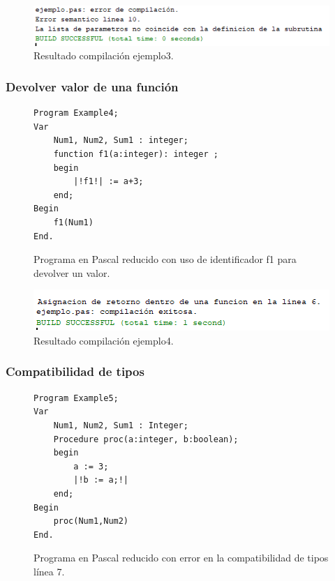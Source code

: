 \begin{figure}[H]
\centering
\includegraphics[]{img/semantico/semantico_ej3.png}
\caption{Resultado compilación ejemplo3.}
\label{fig:semantico_ej3}
\end{figure}

\subsubsection{Devolver valor de una función}
\begin{figure}[H]
\begin{verbatim}
Program Example4;
Var       
    Num1, Num2, Sum1 : integer;
    function f1(a:integer): integer ;
    begin
        |!f1!| := a+3;
    end;
Begin
    f1(Num1)
End.
\end{verbatim}
\caption{Programa en Pascal reducido con uso de identificador f1 para devolver un valor.}
\label{fig:semantico_ej_error_4}
\end{figure}

\begin{figure}[H]
\centering
\includegraphics[]{img/semantico/semantico_ej4.png}
\caption{Resultado compilación ejemplo4.}
\label{fig:semantico_ej4}
\end{figure}

\subsubsection{Compatibilidad de tipos}

\begin{figure}[H]
\begin{verbatim}
Program Example5;
Var       
    Num1, Num2, Sum1 : Integer;
    Procedure proc(a:integer, b:boolean);
    begin
        a := 3;
        |!b := a;!|
    end;
Begin
    proc(Num1,Num2)
End.
\end{verbatim}
\caption{Programa en Pascal reducido con error en la compatibilidad de tipos línea 7.}
\label{fig:semantico_ej_error_5}
\end{figure}

